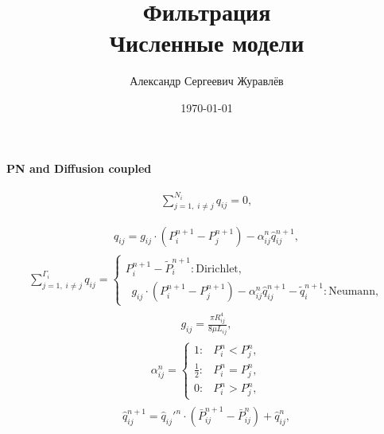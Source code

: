 \documentclass[a4paper,12pt,russian]{extreport}
\author{Александр Сергеевич Журавлёв}
\title{Фильтрация\\Численные модели}
\date{\today}
\begin{document}
\pagecolor{pageColor}
\color{fontColor}
\Russian
\printnomenclature[5em]


\begin{center}
{\large \textbf{PN and Diffusion coupled}}
\end{center}

\begin{eqnarray}
\begin{gathered}
\sum^{N_{i}}_{j=1, \; i\neq j} q_{ij} = 0,   \\
\end{gathered}
\end{eqnarray}
%
\begin{eqnarray}
\begin{gathered}
q_{ij} = g_{ij} \cdot \left(P^{n+1}_{i} - P^{n+1}_{j}\right) - \alpha^n_{ij} \hat{q}^{n+1}_{ij} ,
\end{gathered}
\end{eqnarray}
%
\begin{eqnarray}
\sum^{\Gamma_{i}}_{j=1, \; i\neq j} q_{ij}=\begin{cases}
P^{n+1}_{i} - \tilde{P}^{n+1}_{i}: \text{Dirichlet},\\
\; \; g_{ij} \cdot \left(P^{n+1}_{i} - P^{n+1}_{j}\right) - \alpha^n_{ij} \hat{q}^{n+1}_{ij} - \tilde{q}^{n+1}_{i}: \text{Neumann},
\end{cases}
\end{eqnarray}
%
\begin{eqnarray}
\begin{gathered}
g_{ij} = \frac{\pi R^4_{ij}}{8 \mu L_{ij}},
\end{gathered}
\end{eqnarray}
%
\begin{eqnarray}
\alpha^n_{ij} =\begin{cases}
1: & P^{n}_{i} < P^{n}_{j},\\
 \frac{1}{2} : & P^{n}_{i} = P^{n}_{j},\\
 0: & P^{n}_{i} > P^{n}_{j},
\end{cases}
\end{eqnarray}
%
\begin{eqnarray}
\begin{gathered}
\hat{q}_{ij}^{n+1} = \hat{q}_{ij}'^n \cdot \left(\bar{P}_{ij}^{n+1}-\bar{P}_{ij}^n\right)+\hat{q}_{ij}^n,
\end{gathered}
\end{eqnarray}
\end{document}
